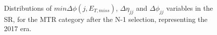 \begin{figure}[htbp]
  \caption{Distributions of $min\Delta\phi(j,E_{T,miss})$, $\Delta \eta_{jj}$ and $\Delta \phi_{jj}$ variables in the SR, for the MTR category after the N-1 selection, representing the 2017 era.}
  \label{fig:sr_n-1_shapes_1}
\end{figure}


\begin{figure}[htbp]
  \centering
    \\
    \subfigure[$p_{T,j1}$]{
}
\end{figure}

